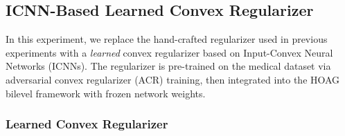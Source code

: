 

\subsection{
ICNN-Based Learned Convex Regularizer}
\label{subsec:exp_icnn}

In this experiment, we replace the hand-crafted regularizer used in previous experiments with a \emph{learned} convex regularizer based on Input-Convex Neural Networks (ICNNs). The regularizer is pre-trained on the medical dataset via adversarial convex regularizer (ACR) training, then integrated into the HOAG bilevel framework with frozen network weights.

\subsubsection{Learned Convex Regularizer}

